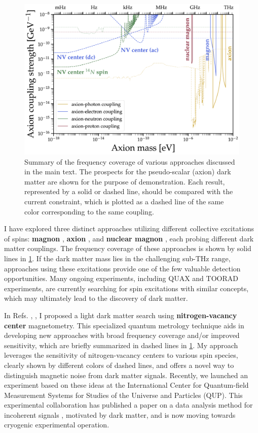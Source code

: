 \documentclass[12pt]{article}
\begin{document}
\begin{figure}[t]
  \centering
  \includegraphics[width=0.8\hsize]{../public/rs/Summary_Plot_2024.png}
  \caption{
    Summary of the frequency coverage of various approaches discussed in the main text.
    The prospects for the pseudo-scalar (axion) dark matter are shown for the purpose of demonstration.
    Each result, represented by a solid or dashed line, should be compared with the current constraint, which is plotted as a dashed line of the same color corresponding to the same coupling.
  }
  \label{fig:summary}
\end{figure}

I have explored three distinct approaches utilizing different collective excitations of spins: \textbf{magnon} \cite{Chigusa:2020gfs}, \textbf{axion} \cite{Chigusa:2021mci}, and \textbf{nuclear magnon} \cite{Chigusa:2023hmz}, each probing different dark matter couplings.
The frequency coverage of these approaches is shown by solid lines in \cref{fig:summary}.
If the dark matter mass lies in the challenging sub-$\mathrm{THz}$ range, approaches using these excitations provide one of the few valuable detection opportunities.
Many ongoing experiments, including QUAX and TOORAD experiments, are currently searching for spin excitations with similar concepts, which may ultimately lead to the discovery of dark matter.

In Refs. \cite{Chigusa:2023hms}, \cite{Chigusa:2024psk}, I proposed a light dark matter search using \textbf{nitrogen-vacancy center} magnetometry.
This specialized quantum metrology technique aids in developing new approaches with broad frequency coverage and/or improved sensitivity, which are briefly summarized in dashed lines in \cref{fig:summary}.
My approach leverages the sensitivity of nitrogen-vacancy centers to various spin species, clearly shown by different colors of dashed lines, and offers a novel way to distinguish magnetic noise from dark matter signals.
Recently, we launched an experiment based on these ideas at the International Center for Quantum-field Measurement Systems for Studies of the Universe and Particles (QUP).
This experimental collaboration has published a paper on a data analysis method for incoherent signals \cite{10.1063/5.0223678}, motivated by dark matter, and is now moving towards cryogenic experimental operation.
\end{document}
